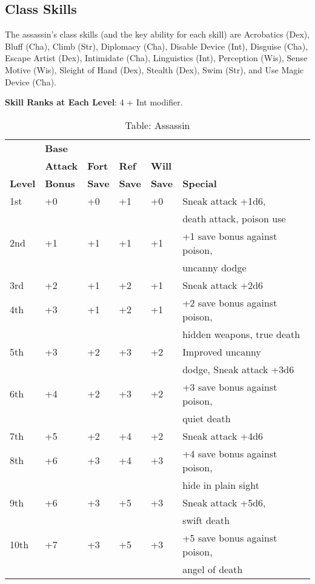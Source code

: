 \subsection{Class Skills}

				
The assassin's class skills (and the key ability for each skill) are Acrobatics (Dex), Bluff (Cha), Climb (Str), Diplomacy (Cha), Disable Device (Int), Disguise (Cha), Escape Artist (Dex), Intimidate (Cha), Linguistics (Int), Perception (Wis), Sense Motive (Wis), Sleight of Hand (Dex), Stealth (Dex), Swim (Str), and Use Magic Device (Cha). 
				
\textbf{ Skill Ranks at Each Level}: 4 + Int modifier.

\begin{table}[]
\sffamily
\caption{Table: Assassin}
\begin{tabular}{llllll}
               & \textbf{Base}  \\
               & \textbf{Attack}& \textbf{Fort} & \textbf{Ref}  & \textbf{Will}\\
\textbf{Level} & \textbf{Bonus} & \textbf{Save} & \textbf{Save} & \textbf{Save} & \textbf{Special}\\
1st & +0 & +0 & +1 & +0 & Sneak attack +1d6, \\
    &    &    &    &    & death attack, poison use\\
2nd & +1 & +1 & +1 & +1 & +1 save bonus against poison, \\
    &    &    &    &    & uncanny dodge \\
3rd & +2 & +1 & +2 & +1 & Sneak attack +2d6\\
4th & +3 & +1 & +2 & +1 & +2 save bonus against poison,\\
    &    &    &    &    &  hidden weapons, true death \\
5th & +3 & +2 & +3 & +2 & Improved uncanny \\
    &    &    &    &    & dodge, Sneak attack +3d6\\
6th & +4 & +2 & +3 & +2 & +3 save bonus against poison, \\
    &    &    &    &    & quiet death\\
7th & +5 & +2 & +4 & +2 & Sneak attack +4d6\\
8th & +6 & +3 & +4 & +3 & +4 save bonus against poison,\\
    &    &    &    &    & hide in plain sight\\
9th & +6 & +3 & +5 & +3 & Sneak attack +5d6, \\
    &    &    &    &    & swift death\\
10th & +7 & +3 & +5 & +3 & +5 save bonus against poison,\\
    &    &     &    &    & angel of death\\
\end{tabular}
\end{table}

